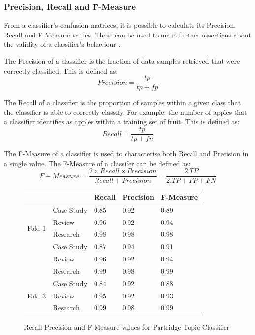 \subsubsection{ Precision, Recall and F-Measure }

From a classifier's confusion matrices, it is possible to calculate its
Precision, Recall and F-Measure values. These can be used to make further
assertions about the validity of a classifier's behaviour
\cite{witten2005data}.

The Precision of a classifier is the fraction of data samples retrieved that
were correctly classified. This is defined as:
\[Precision = \frac{tp}{tp+fp} \]

The Recall of a classifier is the proportion of samples within a given class
that the classifier is able to correctly classify. For example: the number of
apples that a classifier identifies as apples within a training set of fruit.
This is defined as:
\[Recall = \frac{tp}{tp+fn} \]

The F-Measure of a classifier is used to characterise both Recall and Precision
in a single value. The F-Measure of a classifer can be defined as:
\[
F-Measure = \frac{ 2 \times Recall \times Precision} { Recall + Precision } = 
\frac{2 . TP}{ 2 . TP + FP + FN }
\]


\begin{figure}[!th]

\centering
\begin{tabular}{| l | l | l | l | l |}
\hline
&        &\textbf{Recall}&\textbf{Precision}&\textbf{F-Measure}\\
\hline
\hline
\multirow{4}{*}{Fold 1} & Case Study & 0.85 & 0.92 & 0.89 \\
                        & Review     & 0.96 & 0.92 & 0.94 \\
                        & Research   & 0.98 & 0.98 & 0.98 \\
\hline

\multirow{4}{*}{Fold 2} & Case Study & 0.87 & 0.94 & 0.91 \\
                        & Review     & 0.96 & 0.92 & 0.94 \\
                        & Research   & 0.99 & 0.98 & 0.99 \\

\hline

\multirow{4}{*}{Fold 3} &Case Study & 0.84 & 0.92 & 0.88 \\
                        & Review    & 0.95 & 0.92 & 0.93 \\
                        & Research  & 0.99 & 0.98 & 0.99 \\


\hline


\end{tabular}

\caption{Recall Precision and F-Measure values for Partridge Topic Classifier}
\label{fig:fmeasure_table}

\end{figure}

